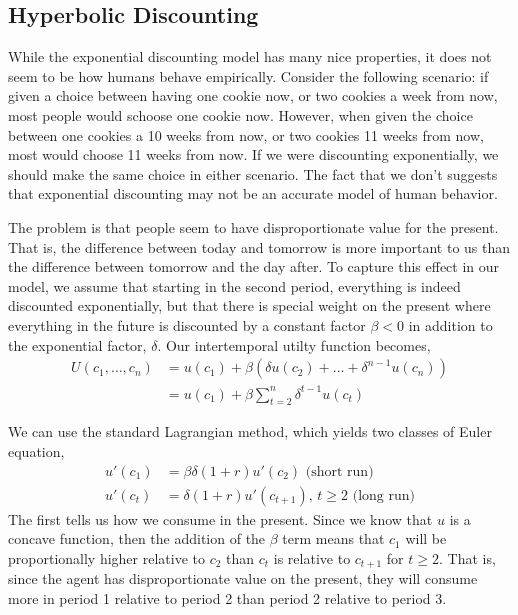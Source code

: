 \subsection*{Hyperbolic Discounting}
While the exponential discounting model has many nice properties, it does not seem to be how humans behave empirically. Consider the following scenario: if given a choice between having one cookie now, or two cookies a week from now, most people would schoose one cookie now. However, when given the choice between one cookies a 10 weeks from now, or two cookies 11 weeks from now, most would choose 11 weeks from now. If we were discounting exponentially, we should make the same choice in either scenario. The fact that we don't suggests that exponential discounting may not be an accurate model of human behavior.

The problem is that people seem to have disproportionate value for the present. That is, the difference between today and tomorrow is more important to us than the difference between tomorrow and the day after. To capture this effect in our model, we assume that starting in the second period, everything is indeed discounted exponentially, but that there is special weight on the present where everything in the future is discounted by a constant factor $\beta < 0$ in addition to the exponential factor, $\delta$. Our intertemporal utilty function becomes,
\begin{align*}
    U(c_1, \dots, c_n) &= u(c_1) + \beta(\delta u(c_2) + \dots + \delta^{n - 1} u(c_n)) \\
    &= u(c_1) + \beta \sum_{t = 2}^n \delta^{t - 1} u(c_t)
\end{align*}

We can use the standard Lagrangian method, which yields two classes of Euler equation,
\begin{align*}
    u'(c_1) &= \beta \delta (1 + r) u'(c_2) \text{  (short run)}\\
    u'(c_t) &= \delta (1 + r) u'(c_{t + 1}), \, t \geq 2 \text{  (long run)}
\end{align*}
The first tells us how we consume in the present. Since we know that $u$ is a concave function, then the addition of the $\beta$ term means that $c_1$ will be proportionally higher relative to $c_2$ than $c_t$ is relative to $c_{t + 1}$ for $t \geq 2$. That is, since the agent has disproportionate value on the present, they will consume more in period 1 relative to period 2 than period 2 relative to period 3.

